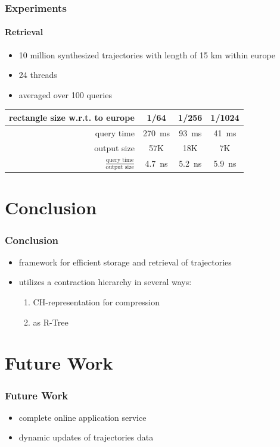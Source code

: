 \documentclass[10pt, t,
aspectratio=1610,%
usenames,
dvipsnames,
]{beamer}
\newcommand{\chrep}{CH-representation\xspace}
\begin{document}
\begin{frame}
	\frametitle{Experiments}
	\framesubtitle{Retrieval}
	\begin{table}
		\begin{itemize}
			\item 10 million synthesized trajectories with length of 15 km within europe \pause
			\item 24 threads \pause
			\item averaged over 100 queries \pause
		\end{itemize}

		\centering
		\begin{tabular}{|r||c|c|c|}
			\hline
			rectangle size w.r.t. to europe                & 1/64                     & 1/256                   & 1/1024                  \\
			\hline
			query time                                     & \SI{270}{\milli \second} & \SI{93}{\milli \second} & \SI{41}{\milli \second} \\
			output size                                    & 57K                      & 18K                     & 7K                      \\
			$\frac{\text{query time}}{\text{output size}}$ & \SI{4.7}{\nano \second}  & \SI{5.2}{\nano \second} & \SI{5.9}{\nano \second} \\
			\hline
		\end{tabular}
	\end{table}
\end{frame}

\section{Conclusion}
\begin{frame}
	\frametitle{Conclusion}
	\begin{itemize}
		\item framework for efficient storage and retrieval of trajectories \pause
		\item utilizes a contraction hierarchy in several ways: \pause
		      \begin{enumerate}
			      \item \chrep for compression \pause
			      \item as R-Tree
		      \end{enumerate}
	\end{itemize}
\end{frame}

\section{Future Work}
\begin{frame}
	\frametitle{Future Work}
	\begin{itemize}
		\item complete online application service \pause
		\item dynamic updates of trajectories data
	\end{itemize}
\end{frame}

\end{document}
